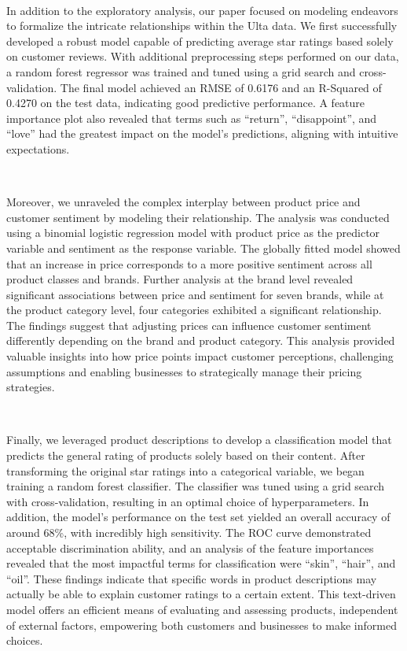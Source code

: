 \documentclass[10pt]{article}
\begin{document}
\

In addition to the exploratory analysis, our paper focused on modeling endeavors to formalize the intricate relationships within the Ulta data. We first successfully developed a robust model capable of predicting average star ratings based solely on customer reviews. With additional preprocessing steps performed on our data, a random forest regressor was trained and tuned using a grid search and cross-validation. The final model achieved an RMSE of 0.6176 and an R-Squared of 0.4270 on the test data, indicating good predictive performance. A feature importance plot also revealed that terms such as ``return'', ``disappoint'', and ``love'' had the greatest impact on the model's predictions, aligning with intuitive expectations.

\

Moreover, we unraveled the complex interplay between product price and customer sentiment by modeling their relationship. The analysis was conducted using a binomial logistic regression model with product price as the predictor variable and sentiment as the response variable. The globally fitted model showed that an increase in price corresponds to a more positive sentiment across all product classes and brands. Further analysis at the brand level revealed significant associations between price and sentiment for seven brands, while at the product category level, four categories exhibited a significant relationship. The findings suggest that adjusting prices can influence customer sentiment differently depending on the brand and product category. This analysis provided valuable insights into how price points impact customer perceptions, challenging assumptions and enabling businesses to strategically manage their pricing strategies. 

\

Finally, we leveraged product descriptions to develop a classification model that predicts the general rating of products solely based on their content. After transforming the original star ratings into a categorical variable, we began training a random forest classifier. The classifier was tuned using a grid search with cross-validation, resulting in an optimal choice of hyperparameters. In addition, the model's performance on the test set yielded an overall accuracy of around 68\%, with incredibly high sensitivity. The ROC curve demonstrated acceptable discrimination ability, and an analysis of the feature importances revealed that the most impactful terms for classification were ``skin'', ``hair'', and ``oil''. These findings indicate that specific words in product descriptions may actually be able to explain customer ratings to a certain extent. This text-driven model offers an efficient means of evaluating and assessing products, independent of external factors, empowering both customers and businesses to make informed choices.
\end{document}
